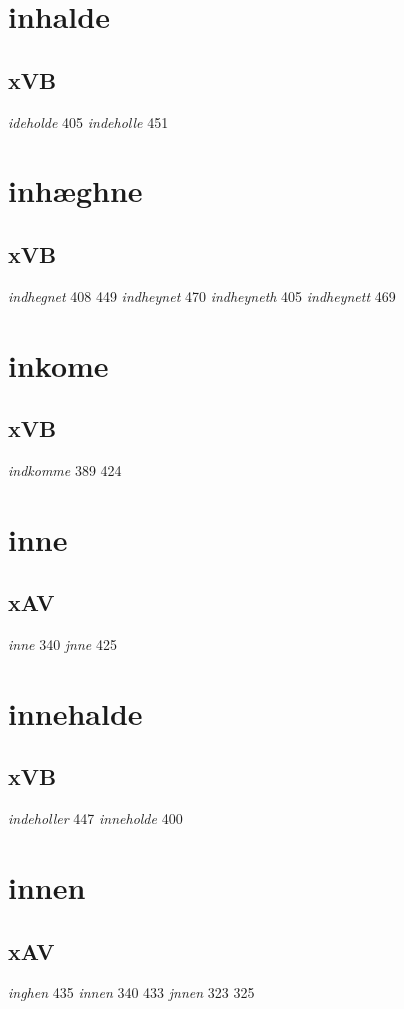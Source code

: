 \documentclass[a4paper,twocolumn]{article}
\begin{document}
\section{inhalde}
\label{sec:orgdd87ac8}
\subsection{xVB}
\label{sec:org5b0f6ab}
\emph{ideholde} 405 \emph{indeholle} 451 
\section{inhæghne}
\label{sec:org8909db4}
\subsection{xVB}
\label{sec:org850cc69}
\emph{indhegnet} 408 449 \emph{indheynet} 470 \emph{indheyneth} 405 \emph{indheynett} 469 
\section{inkome}
\label{sec:orgbccce10}
\subsection{xVB}
\label{sec:org2428b3d}
\emph{indkomme} 389 424 
\section{inne}
\label{sec:orgfe62cd9}
\subsection{xAV}
\label{sec:org70a199c}
\emph{inne} 340 \emph{jnne} 425 
\section{innehalde}
\label{sec:orgd0e9ba8}
\subsection{xVB}
\label{sec:org4cf6f4b}
\emph{indeholler} 447 \emph{inneholde} 400 
\section{innen}
\label{sec:orgaaa22db}
\subsection{xAV}
\label{sec:org404baf7}
\emph{inghen} 435 \emph{innen} 340 433 \emph{jnnen} 323 325 
\end{document}

